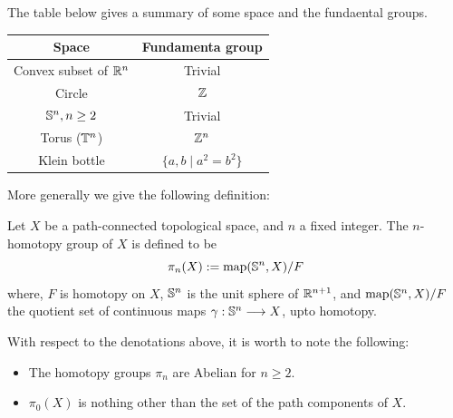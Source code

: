 The table below gives a summary of some space and the fundaental groups.
\begin{table}[H]
  \centering
  \begin{tabular}{c|c}
    \hline
    Space & Fundamenta group \\
    \hline 
    Convex subset of $\mathbb{R}^n$ & Trivial \\
    Circle & $\mathbb{Z}$ \\
    $\mathbb{S}^n, n \ge 2$ & Trivial \\
    Torus ($\mathbb{T}^n$) & $\mathbb{Z}^n$ \\
    Klein bottle & $\{a, b \mid a^2 = b^2\}$
    \end{tabular}
\end{table}

More generally we give the following definition:

\begin{defn}\cite{mamouni2022pure}
   Let $X$ be a path-connected topological space, and $n$ a fixed integer. The $n$-homotopy group of $X$ is defined to be 
   \[  
      \pi_n(X) := \operatorname{map}(\mathbb{S}^n, X) / F
   \]
   where, $F$ is homotopy on $X$, $\mathbb{S}^n$ is the unit sphere of $\mathbb{R}^{n+1}$, and $\operatorname{map}(\mathbb{S}^n, X) / F$ the quotient set of continuous maps $\gamma: \mathbb{S}^n \longrightarrow X$, upto homotopy.
\end{defn}

\begin{rem}
  With respect to the denotations above, it is worth to note the following:
  \begin{itemize}
    \item The homotopy groups $\pi_n$ are Abelian for $n \ge 2$.
    \item $\pi_0(X)$ is nothing other than the set of the path components of $X$.
  \end{itemize}
\end{rem}


